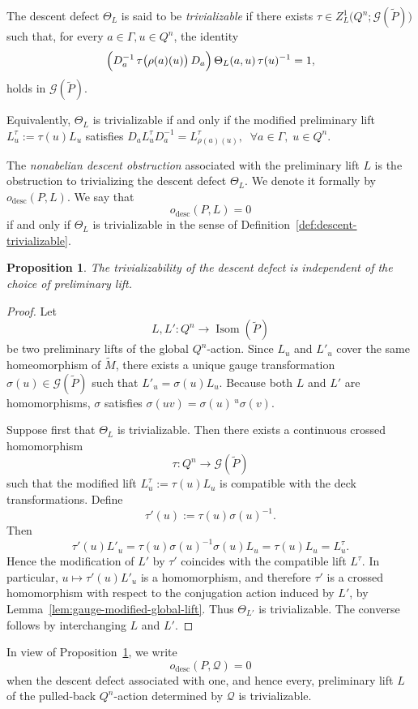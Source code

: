 \documentclass[11pt,a4paper]{article}
\numberwithin{equation}{section}
\newtheorem{prop}[definition]{Proposition}
\theoremstyle{named}
\begin{document}
\begin{definition}
\label{def:descent-trivializable}
The descent defect \(\Theta_L\) is said to be \emph{trivializable} if there
exists $\tau\in
Z_L^1\bigl(Q^n;\mathcal G(\widetilde P)\bigr)$
such that, for every $a\in\Gamma,u\in Q^n$, the identity
\begin{equation}
\label{eq:descent-trivialization}
\Bigl( D_a^{-1}\, \tau\bigl(\rho(a)(u)\bigr)\, D_a \Bigr) \, \Theta_L(a,u) \, \tau(u)^{-1} =1,
\end{equation}
holds in $\mathcal G(\widetilde P)$.
\end{definition}

Equivalently, \(\Theta_L\) is trivializable if and only if the modified preliminary lift $L_u^\tau:=\tau(u)L_u$
satisfies $D_aL_u^\tau D_a^{-1}
=
L_{\rho(a)(u)}^\tau,\;\;\forall a\in\Gamma,\;u\in Q^n$.

\begin{definition}
\label{def:descent-obstruction}
The \emph{nonabelian descent obstruction} associated with the preliminary lift \(L\) is the obstruction to trivializing the descent defect \(\Theta_L\). We denote it formally by $o_{\mathrm{desc}}(P,L)$. 
We say that
\[
o_{\mathrm{desc}}(P,L)=0
\]
if and only if \(\Theta_L\) is trivializable in the sense of Definition~\ref{def:descent-trivializable}.
\end{definition}

\begin{prop}
\label{prop:descent-independence}
The trivializability of the descent defect is independent of the choice of preliminary lift.
\end{prop}

\begin{proof}
Let
\[
L,L':Q^n\longrightarrow\operatorname{Isom}(\widetilde P)
\]
be two preliminary lifts of the global \(Q^n\)-action. Since \(L_u\) and
\(L'_u\) cover the same homeomorphism of \(\widetilde M\), there exists a unique gauge transformation $\sigma(u)\in\mathcal G(\widetilde P)$
such that $L'_u=\sigma(u)L_u$.
Because both \(L\) and \(L'\) are homomorphisms, \(\sigma\) satisfies $\sigma(uv)
=
\sigma(u)\,{}^u\sigma(v)$.

Suppose first that \(\Theta_L\) is trivializable. Then there exists a
continuous crossed homomorphism
\[
\tau:Q^n\longrightarrow\mathcal G(\widetilde P)
\]
such that the modified lift $L_u^\tau:=\tau(u)L_u$
is compatible with the deck transformations. Define
\[
\tau'(u):=\tau(u)\sigma(u)^{-1}.
\]
Then
\[
\tau'(u)L'_u
=
\tau(u)\sigma(u)^{-1}\sigma(u)L_u
=
\tau(u)L_u
=
L_u^\tau.
\]
Hence the modification of \(L'\) by \(\tau'\) coincides with the compatible lift \(L^\tau\). In particular, \(u\mapsto\tau'(u)L'_u\) is a homomorphism, and therefore \(\tau'\) is a crossed homomorphism with respect to the conjugation action induced by \(L'\), by Lemma~\ref{lem:gauge-modified-global-lift}. Thus \(\Theta_{L'}\) is trivializable. The converse follows by interchanging \(L\) and \(L'\). 
\end{proof}
 In view of Proposition~\ref{prop:descent-independence}, we write
\[
o_{\mathrm{desc}}(P,\mathcal Q)=0
\]
when the descent defect associated with one, and hence every, preliminary lift $L$  of the pulled-back \(Q^n\)-action determined by \(\mathcal Q\) is trivializable.
\end{document}
